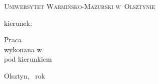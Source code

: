 
\thispagestyle{empty}

\begin{center}
    \vspace*{0.5cm}

    {\Large\textsc{Uniwersytet Warmińsko-Mazurski w~Olsztynie}\par}
    \vspace{0.3cm}
    {\Large\textsc{\thesisFacultyPL}\par}

    \vfill

    {\Large\bfseries \thesisauthor\par}
    \vspace{0.3cm}
    {\large kierunek: \thesisFieldPL\par}

    \vfill

    {\LARGE\bfseries \thesistitlePL\par}

    \vfill\vfill

    \begin{minipage}{0.85\textwidth}
        \centering
        \large
        Praca \thesisDegreePL\\[0.3cm]
        wykonana w \thesisChairPL\\[0.3cm]
        pod kierunkiem\\
        \thesisAdvisorPL
    \end{minipage}

    \vfill

    {\large Olsztyn, \graduationyear\ rok\par}
    \vspace*{0.5cm}
\end{center}

\cleardoublepage
\thispagestyle{empty}

